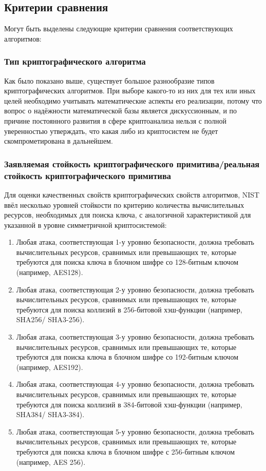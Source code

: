 \subsection{Критерии сравнения}
Могут быть выделены следующие критерии сравнения соответствующих алгоритмов:

\subsubsection{Тип криптографического алгоритма}
Как было показано выше, существует большое разнообразие типов криптографических алгоритмов. При выборе какого-то из них для тех или иных целей необходимо учитывать математические аспекты его реализации, потому что вопрос о надёжности математической базы является дискуссионным\cite{lattice_attack}, и по причине постоянного развития в сфере криптоанализа нельзя с полной уверенностью утверждать, что какая либо из криптосистем не будет скомпрометирована в дальнейшем.

\subsubsection{Заявляемая стойкость криптографического примитива/реальная стойкость криптографического примитива}

Для оценки качественных свойств криптографических свойств алгоритмов, NIST ввёл несколько уровней стойкости по критерию количества вычислительных ресурсов, необходимых для поиска ключа, с аналогичной характеристикой для указанной в уровне симметричной криптосистемой\cite{Security_Evaluation_Criteria}:
\begin{enumerate}
    \item Любая атака, соответствующая 1-у уровню безопасности, должна требовать вычислительных ресурсов, сравнимых или превышающих те, которые требуются для поиска ключа в блочном шифре со 128-битным ключом (например, AES128).
    \item Любая атака, соответствующая 2-у уровню безопасности, должна требовать вычислительных ресурсов, сравнимых или превышающих те, которые требуются для поиска коллизий в 256-битовой хэш-функции (например, SHA256/ SHA3-256).
    \item Любая атака, соответствующая 3-у уровню безопасности, должна требовать вычислительных ресурсов, сравнимых или превышающих те, которые требуются для поиска ключа в блочном шифре со 192-битным ключом (например, AES192).
    \item Любая атака, соответствующая 4-у уровню безопасности, должна требовать вычислительных ресурсов, сравнимых или превышающих те, которые требуются для поиска коллизий в 384-битовой хэш-функции (например, SHA384/ SHA3-384).
    \item Любая атака, соответствующая 5-у уровню безопасности, должна требовать вычислительных ресурсов, сравнимых или превышающих те, которые требуются для поиска ключа в блочном шифре с 256-битным ключом (например, AES 256).
\end{enumerate}

